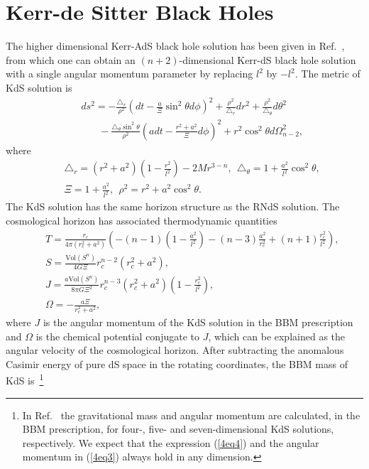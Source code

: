 \documentclass[a4paper,12pt]{article}
\newcommand{\sect}[1]{\setcounter{equation}{0}\section{#1}}
\begin{document}

\sect{Kerr-de Sitter Black Holes}

The higher dimensional Kerr-AdS black hole solution has been given in Ref.~\cite{Hawk}, from 
which one can obtain an $(n+2)$-dimensional Kerr-dS black hole solution with a single angular
momentum parameter by replacing $l^2$ by $-l^2$. The metric of KdS solution is
\begin{eqnarray}
\label{4eq1}
&& ds^2=- \frac{\triangle_r}{\rho^2}\left(dt-\frac{a}{\Xi}\sin^2\theta d\phi\right)^2 
     +\frac{\rho^2}{\triangle_r}dr^2 +\frac{\rho^2}{\triangle_{\theta}}d\theta^2
      \nonumber \\
&&~~~~~~~~- \frac{\triangle_{\theta}\sin^2\theta}{\rho^2}\left(adt 
        -\frac{r^2+a^2}{\Xi}d\phi\right)^2 + r^2\cos^2\theta d\Omega_{n-2}^2,
\end{eqnarray}
where 
\begin{eqnarray}
\label{4eq2}
&& \triangle_r =(r^2+a^2)\left(1-\frac{r^2}{l^2}\right) -2M r^{3-n}, \ \
  \triangle_\theta =1+\frac{a^2}{l^2}\cos^2\theta, \nonumber \\
&& \Xi= 1+\frac{a^2}{l^2}, \ \ \rho^2 =r^2 +a^2\cos^2\theta.
\end{eqnarray}
The KdS solution has the same horizon structure as the RNdS solution. The cosmological horizon
has associated thermodynamic quantities
\begin{eqnarray}
\label{4eq3}
&& T =\frac{r_c}{4\pi (r_c^2 +a^2)}\left(-(n-1)\left(1-\frac{a^2}{l^2}\right)
     -(n-3)\frac{a^2}{r_c^2}+(n+1)\frac{r_c^2}{l^2}\right), 
      \nonumber \\
&& S= \frac{\mbox{Vol}(S^n)}{4G\Xi}r_c^{n-2}(r_c^2+a^2), \nonumber \\
&& J=\frac{a\mbox{Vol}(S^n)}{8\pi G\Xi^2}r_c^{n-3}(r_c^2+a^2)\left(1-\frac{r_c^2}{l^2}\right),
      \nonumber \\
&& \Omega =-\frac{a \Xi}{r_c^2+a^2},
\end{eqnarray}
where $J$ is the angular momentum  of the KdS solution in the BBM prescription~\cite{Dehg}
and $\Omega$ is the chemical potential conjugate to $J$, which can be explained as the
angular velocity of the cosmological horizon.  After subtracting the anomalous Casimir energy
of pure dS space in the rotating coordinates, the BBM mass of KdS 
is~\cite{Dehg}\footnote{In Ref.~\cite{Dehg} the gravitational mass and angular momentum 
are calculated, in the BBM prescription, for four-, five- and seven-dimensional KdS solutions,
respectively. We expect that the expression (\ref{4eq4}) and the angular momentum 
in (\ref{4eq3}) always hold in any dimension.}
\end{document}

